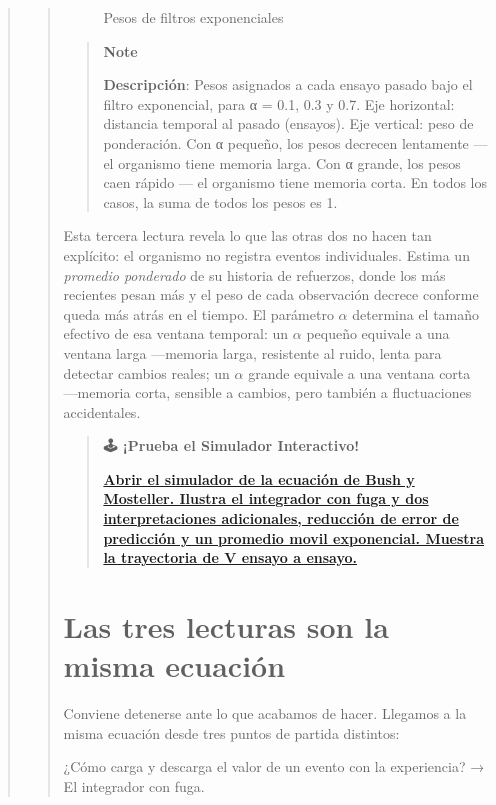 \documentclass[
  letterpaper,
  DIV=11,
  numbers=noendperiod]{scrreprt}
\begin{document}
\begin{tcolorbox}[enhanced jigsaw, toprule=.15mm, arc=.35mm, colback=white, opacityback=0, colframe=quarto-callout-note-color-frame, breakable, rightrule=.15mm, left=2mm, leftrule=.75mm, bottomrule=.15mm]
\begin{quote}
\begin{quote}
\begin{figure}[H]
{}

\caption{Pesos de filtros exponenciales}

\end{figure}%

\begin{quote}
\textbf{Note}

\textbf{Descripción}: Pesos asignados a cada ensayo pasado bajo el
filtro exponencial, para α = 0.1, 0.3 y 0.7. Eje horizontal: distancia
temporal al pasado (ensayos). Eje vertical: peso de ponderación. Con α
pequeño, los pesos decrecen lentamente --- el organismo tiene memoria
larga. Con α grande, los pesos caen rápido --- el organismo tiene
memoria corta. En todos los casos, la suma de todos los pesos es 1.
\end{quote}

Esta tercera lectura revela lo que las otras dos no hacen tan explícito:
el organismo no registra eventos individuales. Estima un \emph{promedio
ponderado} de su historia de refuerzos, donde los más recientes pesan
más y el peso de cada observación decrece conforme queda más atrás en el
tiempo. El parámetro \(\alpha\) determina el tamaño efectivo de esa
ventana temporal: un \(\alpha\) pequeño equivale a una ventana larga
---memoria larga, resistente al ruido, lenta para detectar cambios
reales; un \(\alpha\) grande equivale a una ventana corta ---memoria
corta, sensible a cambios, pero también a fluctuaciones accidentales.

\begin{quote}
\textbf{🕹️ ¡Prueba el Simulador Interactivo!}

\href{https://colab.research.google.com/github/arbouria/Libro-ACA-2026/blob/main/Simuladores/Bush_Mosteller.ipynb}{\textbf{Abrir
el simulador de la ecuación de Bush y Mosteller. Ilustra el integrador
con fuga y dos interpretaciones adicionales, reducción de error de
predicción y un promedio movil exponencial. Muestra la trayectoria de V
ensayo a ensayo.}}
\end{quote}

\section{Las tres lecturas son la misma
ecuación}\label{las-tres-lecturas-son-la-misma-ecuaciuxf3n}

Conviene detenerse ante lo que acabamos de hacer. Llegamos a la misma
ecuación desde tres puntos de partida distintos:

¿Cómo carga y descarga el valor de un evento con la experiencia? → El
integrador con fuga.


\end{quote}
\end{quote}
\end{tcolorbox}
\end{document}
